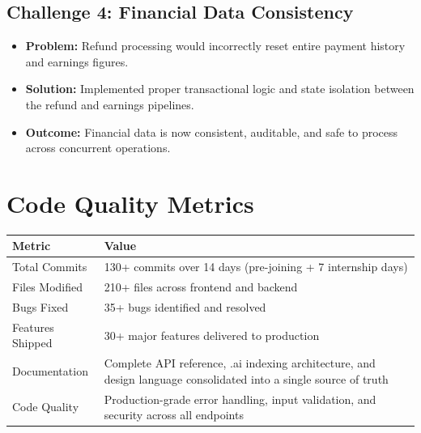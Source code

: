 \documentclass[11pt,a4paper]{article}
\begin{document}
\begin{itemize}
{\subsection{Challenge 4: Financial Data Consistency}

\begin{itemize}
  \item \textbf{Problem:} Refund processing would incorrectly reset entire payment history
        and earnings figures.
  \item \textbf{Solution:} Implemented proper transactional logic and state isolation between
        the refund and earnings pipelines.
  \item \textbf{Outcome:} Financial data is now consistent, auditable, and safe to process
        across concurrent operations.
\end{itemize}

\newpage

\section{Code Quality Metrics}

\begin{table}[h!]
\centering
\begin{tabularx}{\textwidth}{l X}
\toprule
\textbf{Metric} & \textbf{Value} \\
\midrule
Total Commits    & 130+ commits over 14 days (pre-joining + 7 internship days) \\
Files Modified   & 210+ files across frontend and backend \\
Bugs Fixed       & 35+ bugs identified and resolved \\
Features Shipped & 30+ major features delivered to production \\
Documentation    & Complete API reference, .ai indexing architecture, and design
                   language consolidated into a single source of truth \\
Code Quality     & Production-grade error handling, input validation, and security
                   across all endpoints \\
\bottomrule
\end{tabularx}
\end{table}

\newpage

}
\end{itemize}
\end{document}
